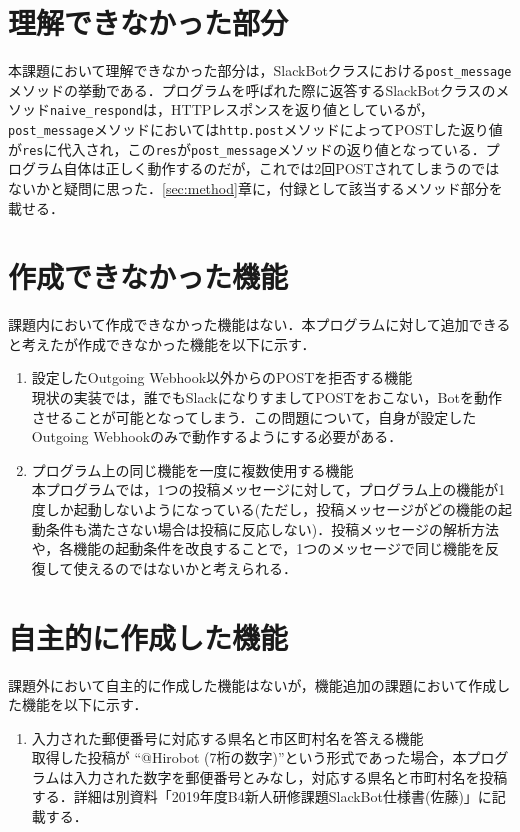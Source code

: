 \documentclass[12pt]{jsarticle}
\begin{document}
\section{理解できなかった部分}
本課題において理解できなかった部分は，SlackBotクラスにおける\verb|post_message|メソッドの挙動である．プログラムを呼ばれた際に返答するSlackBotクラスのメソッド\verb|naive_respond|は，HTTPレスポンスを返り値としているが，\verb|post_message|メソッドにおいては\verb|http.post|メソッドによってPOSTした返り値が\verb|res|に代入され，この\verb|res|が\verb|post_message|メソッドの返り値となっている．プログラム自体は正しく動作するのだが，これでは2回POSTされてしまうのではないかと疑問に思った．\ref{sec:method}章に，付録として該当するメソッド部分を載せる．

\section{作成できなかった機能}
課題内において作成できなかった機能はない．本プログラムに対して追加できると考えたが作成できなかった機能を以下に示す．

\begin{enumerate}
\item 設定したOutgoing Webhook以外からのPOSTを拒否する機能\\
  現状の実装では，誰でもSlackになりすましてPOSTをおこない，Botを動作させることが可能となってしまう．この問題について，自身が設定したOutgoing Webhookのみで動作するようにする必要がある．
\item プログラム上の同じ機能を一度に複数使用する機能\\
  本プログラムでは，1つの投稿メッセージに対して，プログラム上の機能が1度しか起動しないようになっている(ただし，投稿メッセージがどの機能の起動条件も満たさない場合は投稿に反応しない)．投稿メッセージの解析方法や，各機能の起動条件を改良することで，1つのメッセージで同じ機能を反復して使えるのではないかと考えられる．
\end{enumerate}

\section{自主的に作成した機能}
課題外において自主的に作成した機能はないが，機能追加の課題において作成した機能を以下に示す．

\begin{enumerate}
\item 入力された郵便番号に対応する県名と市区町村名を答える機能\\
  取得した投稿が ``@Hirobot (7桁の数字)''という形式であった場合，本プログラムは入力された数字を郵便番号とみなし，対応する県名と市町村名を投稿する．詳細は別資料「2019年度B4新人研修課題SlackBot仕様書(佐藤)」に記載する．
\end{enumerate}
\end{document}

